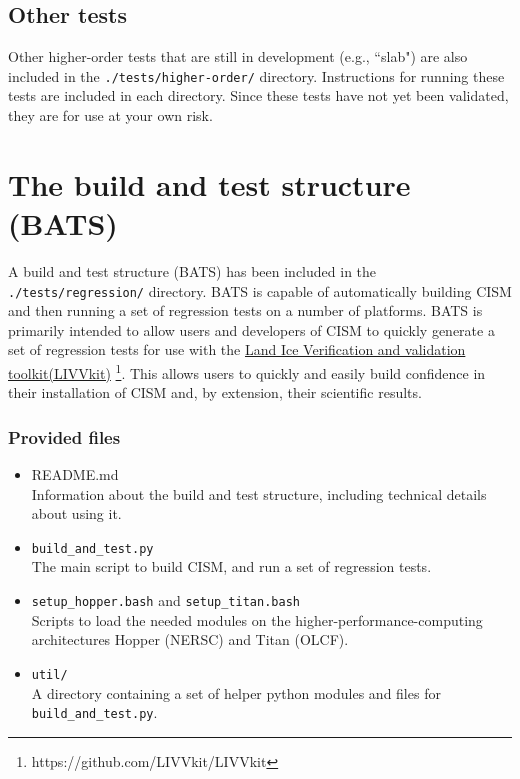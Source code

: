 \subsection{Other tests}
Other higher-order tests that are still in development (e.g., ``slab") are also included in the \texttt{./tests/higher-order/}
directory. Instructions for running these tests are included in each directory. Since these tests have not yet been validated, 
they are for use at your own risk.

\section{The build and test structure (BATS)}
\label{sc:bats}
A build and test structure (BATS) has been included in the \texttt{./tests/regression/} directory. BATS is capable of
automatically building CISM and then running a set of regression tests on a number of platforms. BATS is primarily
intended to allow users and developers of CISM to quickly generate a set of regression tests for use with the
\href{https://github.com/LIVVkit/LIVVkit}{Land Ice Verification and validation toolkit(LIVVkit)}
\footnote{https://github.com/LIVVkit/LIVVkit}. This allows users to quickly and easily build
confidence in their installation of CISM and, by extension, their scientific results. 

\subsubsection{Provided files}

\begin{itemize}
	\item README.md \\
		Information about the build and test structure, including technical details about using it.
    \item \texttt{build\_and\_test.py} \\
		The main script to build CISM, and run a set of regression tests.
    \item \texttt{setup\_hopper.bash} and \texttt{setup\_titan.bash} \\
        Scripts to load the needed modules on the higher-performance-computing architectures Hopper (NERSC) and Titan
        (OLCF).
    \item \texttt{util/} \\
        A directory containing a set of helper python modules and files for \texttt{build\_and\_test.py}.
\end{itemize}

